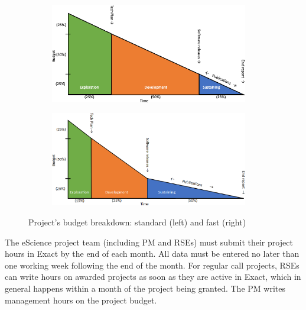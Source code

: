 \begin{figure}[t!]
    \centering
    \begin{subfigure}[b]{0.49\textwidth}
        \centering
        \includegraphics[width=0.95\textwidth]{img/budget-stages.png}
        \vspace{0.2cm}
    \end{subfigure}%
    \hfill
    \begin{subfigure}[b]{0.49\textwidth}
        \centering
        \includegraphics[width=0.95\textwidth]{img/budget-faster.png}
        \vspace{0.2cm}
    \end{subfigure}
    \caption{Project's budget breakdown: standard (left) and fast (right)}
    \label{fig:project-budget}
\end{figure}

The eScience project team (including PM and RSEs) must submit their project hours in Exact by the end of each month. All data must be entered no later than one working week following the end of the month. 
%
For regular call projects, RSEs can write hours on awarded projects as soon as they are active in Exact, which in general
happens within a month of the project being granted. The PM writes management hours on the project budget.

